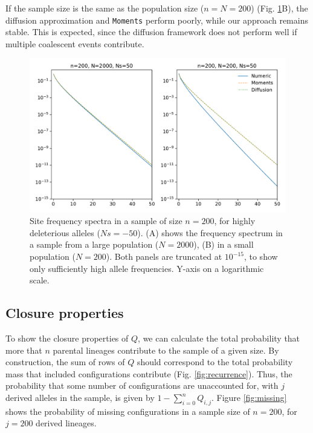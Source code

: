 \documentclass[review]{elsarticle}
\begin{document}
If the sample size is the same as the population size ($n=N=200$) (Fig.
\ref{fig:strong-selection}B), the diffusion approximation and \texttt{Moments} perform poorly, while
our approach remains stable. This is expected, since the diffusion framework does not perform well
if multiple coalescent events contribute.

\begin{figure}
  \centering
  \includegraphics[width=0.7\textheight]{fig/strong_selection.pdf}
  \caption{Site frequency spectra in a sample of size $n=200$, for highly deleterious alleles
    ($Ns=-50$). (A) shows the frequency spectrum in a sample from a large population ($N=2000$), (B)
  in a small population ($N=200$). Both panels are truncated at $10^{-15}$, to show only
  sufficiently high allele frequencies. Y-axis on a logarithmic scale.}
  \label{fig:strong-selection}
\end{figure}

\subsection{Closure properties}
\label{subsec:closure}

To show the closure properties of $Q$, we can calculate the total probability that more that $n$
parental lineages contribute to the sample of a given size. By construction, the sum of rows of $Q$
should correspond to the total probability mass that included configurations contribute
(Fig. \ref{fig:recurrence}). Thus, the probability that some number of configurations are
unaccounted for, with $j$ derived alleles in the sample, is given by
$1-\sum_{i=0}^{n}Q_{i,j}$. Figure \ref{fig:missing} shows the probability of missing configurations
in a sample size of $n=200$, for $j=200$ derived lineages.
\end{document}

